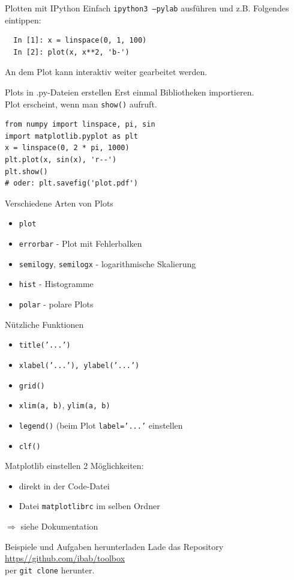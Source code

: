 \begin{frame}[fragile]{Plotten mit IPython}
  Einfach \texttt{ipython3 --pylab} ausführen und z.B. Folgendes eintippen:
\begin{verbatim}
  In [1]: x = linspace(0, 1, 100)
  In [2]: plot(x, x**2, 'b-')
\end{verbatim}
  An dem Plot kann interaktiv weiter gearbeitet werden.
\end{frame}

\begin{frame}[fragile]{Plots in .py-Dateien erstellen}
  Erst einmal Bibliotheken importieren.\\
  Plot erscheint, wenn man \texttt{show()} aufruft.
\begin{verbatim}
from numpy import linspace, pi, sin
import matplotlib.pyplot as plt
x = linspace(0, 2 * pi, 1000)
plt.plot(x, sin(x), 'r--')
plt.show()
# oder: plt.savefig('plot.pdf')
\end{verbatim}
\end{frame}

\begin{frame}{Verschiedene Arten von Plots}
  \begin{itemize}
    \item \texttt{plot}
    \item \texttt{errorbar} - Plot mit Fehlerbalken
    \item \texttt{semilogy}, \texttt{semilogx} - logarithmische Skalierung
    \item \texttt{hist} - Histogramme
    \item \texttt{polar} - polare Plots
  \end{itemize}
\end{frame}

\begin{frame}{Nützliche Funktionen}
  \begin{itemize}
    \item \texttt{title('...')}
    \item \texttt{xlabel('...'), ylabel('...')}
    \item \texttt{grid()}
    \item \texttt{xlim(a, b)}, \texttt{ylim(a, b)}
    \item \texttt{legend()} (beim Plot \texttt{label='...'} einstellen
    \item \texttt{clf()}
  \end{itemize}
\end{frame}

\begin{frame}{Matplotlib einstellen}
  2 Möglichkeiten:
  \begin{itemize}
    \item direkt in der Code-Datei
    \item Datei \texttt{matplotlibrc} im selben Ordner
  \end{itemize}
  $\Rightarrow$ siehe Dokumentation
\end{frame}

\begin{frame}{Beispiele und Aufgaben herunterladen}
  Lade das Repository \\
  \url{https//github.com/ibab/toolbox} \\
  per \texttt{git clone} herunter.
\end{frame}
  
